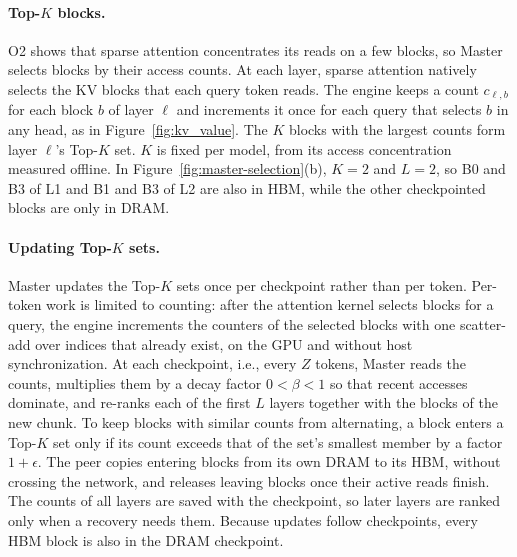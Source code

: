 \paragraph{Top-$K$ blocks.}
O2 shows that sparse attention concentrates its reads on a few blocks, so
Master selects blocks by their access counts. At each layer, sparse
attention natively selects the KV blocks that each query token reads. The
engine keeps a count $c_{\ell,b}$ for each block $b$ of layer $\ell$ and
increments it once for each query that selects $b$ in any head, as in
Figure~\ref{fig:kv_value}. The $K$ blocks with the largest counts form
layer $\ell$'s Top-$K$ set. $K$ is fixed per model, from its access
concentration measured offline. In Figure~\ref{fig:master-selection}(b),
$K=2$ and $L=2$, so B0 and B3 of L1 and B1 and B3 of L2 are also in HBM,
while the other checkpointed blocks are only in DRAM.

\paragraph{Updating Top-$K$ sets.}
Master updates the Top-$K$ sets once per checkpoint rather than per
token. Per-token work is limited to counting: after the attention kernel
selects blocks for a query, the engine increments the counters of the
selected blocks with one scatter-add over indices that already exist, on
the GPU and without host synchronization. At each checkpoint, i.e., every
$Z$ tokens, Master reads the counts, multiplies them by a decay factor
$0<\beta<1$ so that recent accesses dominate, and re-ranks each of the
first $L$ layers together with the blocks of the new chunk. To keep blocks
with similar counts from alternating, a block enters a Top-$K$ set only if
its count exceeds that of the set's smallest member by a factor $1+\epsilon$.
The peer copies entering blocks from its own DRAM to its HBM, without
crossing the network, and releases leaving blocks once their active reads
finish. The counts of all layers are saved with the checkpoint, so later
layers are ranked only when a recovery needs them. Because updates follow
checkpoints, every HBM block is also in the DRAM checkpoint.

